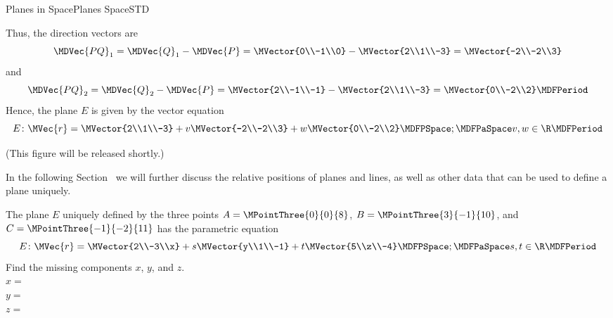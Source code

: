 \begin{MXContent}{Planes in Space}{Planes Space}{STD}
\begin{MExample}
\[\]
Thus, the direction vectors are 
\[
 \MDVec{P Q}_1=\MDVec{Q}_1 - \MDVec{P} = \MVector{0\\-1\\0} - \MVector{2\\1\\-3} = \MVector{-2\\-2\\3}
\]
and
\[
 \MDVec{P Q}_2=\MDVec{Q}_2 - \MDVec{P} = \MVector{2\\-1\\-1} - \MVector{2\\1\\-3} = \MVector{0\\-2\\2} \MDFPeriod
\]
Hence, the plane $E$ is given by the vector equation
\[
 E\colon\MVec{r}=\MVector{2\\1\\-3}+v\MVector{-2\\-2\\3}+w\MVector{0\\-2\\2}\MDFPSpace;\MDFPaSpace v,w\in\R \MDFPeriod
\]

(This figure will be released shortly.)
\end{MExample}

In the following Section~ we will further discuss the relative positions of 
planes and lines, as well as other data that can be used to define a plane uniquely.

\begin{MExercise}
The plane $E$ uniquely defined by the three points $A=\MPointThree{0}{0}{8}$, $B=\MPointThree{3}{-1}{10}$, and 
$C=\MPointThree{-1}{-2}{11}$ has the parametric equation
\[
 E\colon\MVec{r}=\MVector{2\\-3\\x}+s\MVector{y\\1\\-1}+t\MVector{5\\z\\-4}\MDFPSpace;\MDFPaSpace s,t\in\R \MDFPeriod
\]
Find the missing components $x$, $y$, and $z$.\\
$x=$\\
$y=$\\
$z=$\\


\end{MExercise}
\end{MXContent}
